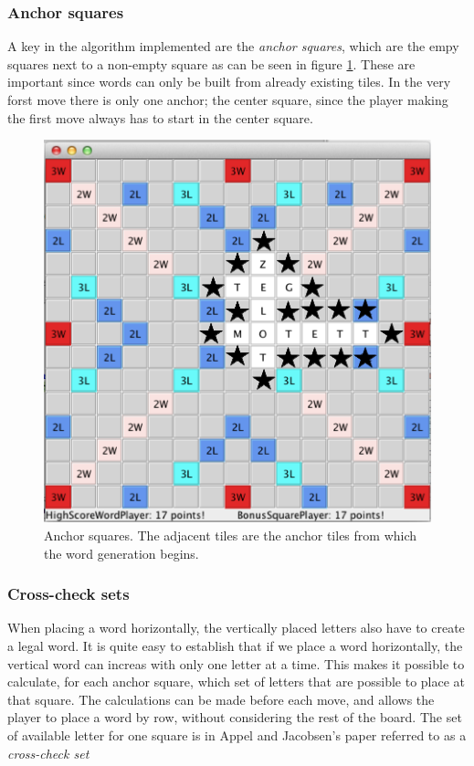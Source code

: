 \documentclass[a4paper, 12pt]{report}
\begin{document}
\subsubsection{Anchor squares}
A key in the algorithm implemented are the \emph{anchor squares}, which are the empy squares next to a non-empty square as can be seen in figure \ref{fig:anchors}. These are important since words can only be built from already existing tiles. In the very forst move there is only one anchor; the center square, since the player making the first move always has to start in the center square.

\begin{figure}[h]
\centering
\includegraphics[scale=0.3]{anchors}
\caption{Anchor squares. The adjacent tiles are the anchor tiles from which the word generation begins.}
\label{fig:anchors}
\end{figure}

\subsubsection{Cross-check sets}
When placing a word horizontally, the vertically placed letters also have to create a legal word. It is quite easy to establish that if we place a word horizontally, the vertical word can increas with only one letter at a time. This makes it possible to calculate, for each anchor square, which set of letters that are possible to place at that square. The calculations can be made before each move, and allows the player to place a word by row, without considering the rest of the board. The set of available letter for one square is in Appel and Jacobsen's paper \cite{fastest} referred to as a \emph{cross-check set}
\end{document}
